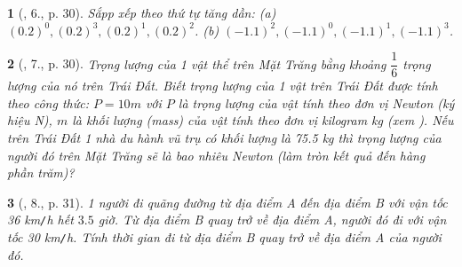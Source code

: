 \documentclass{article}
\newtheorem{baitoan}{}
\begin{document}
\begin{baitoan}[\cite{SGK_Toan_7_Canh_Dieu_tap_1}, 6., p. 30]
	Sắpp xếp theo thứ tự tăng dần: (a) $(0.2)^0,(0.2)^3,(0.2)^1,(0.2)^2$. (b) $(-1.1)^2,(-1.1)^0,(-1.1)^1,(-1.1)^3$.
\end{baitoan}

\begin{baitoan}[\cite{SGK_Toan_7_Canh_Dieu_tap_1}, 7., p. 30]
	Trọng lượng của 1 vật thể trên Mặt Trăng bằng khoảng $\dfrac{1}{6}$ trọng lượng của nó trên Trái Đất. Biết trọng lượng của 1 vật trên Trái Đất được tính theo công thức: $P = 10m$ với $P$ là trọng lượng của vật tính theo đơn vị Newton (ký hiệu {\rm N}), $m$ là khối lượng (mass) của vật tính theo đơn vị kilogram {\rm kg} (xem {\rm\cite[\S29, pp. 149--150]{SGK_KHTN_6_Canh_Dieu}}). Nếu trên Trái Đất 1 nhà du hành vũ trụ có khối lượng là {\rm75.5 kg} thì trọng lượng của người đó trên Mặt Trăng sẽ là bao nhiêu Newton (làm tròn kết quả đến hàng phần trăm)?
\end{baitoan}

\begin{baitoan}[\cite{SGK_Toan_7_Canh_Dieu_tap_1}, 8., p. 31]
	1 người đi quãng đường từ địa điểm A đến địa điểm B với vận tốc {\rm36 km{\tt/}h} hết $3.5$ giờ. Từ địa điểm B quay trở về địa điểm A, người đó đi với vận tốc {\rm30 km{\tt/}h}. Tính thời gian đi từ địa điểm B quay trở về địa điểm A của người đó.
\end{baitoan}
\end{document}
